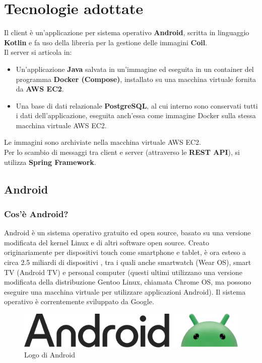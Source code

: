     \section{Tecnologie adottate}
        Il client è un'applicazione per sistema operativo \textbf{Android}, scritta in linguaggio \textbf{Kotlin} e fa uso della libreria per la gestione delle immagini \textbf{Coil}. \\
        Il server si articola in:
        \begin{itemize}
            \item Un'applicazione \textbf{Java} salvata in un'immagine ed eseguita in un container del programma \textbf{Docker (Compose)}, installato su una macchina virtuale fornita da \textbf{AWS EC2}.
            \item Una base di dati relazionale \textbf{PostgreSQL}, al cui interno sono conservati tutti i dati dell'applicazione, eseguita anch'essa come immagine Docker sulla stessa macchina virtuale AWS EC2.
        \end{itemize}
        Le immagini sono archiviate nella macchina virtuale AWS EC2. \\
        Per lo scambio di messaggi tra client e server (attraverso le \textbf{REST API}), si utilizza \textbf{Spring Framework}. \\

        \subsection{Android}
            \subsubsection{Cos'è Android? \cite{Wikipedia1}}
                Android è un sistema operativo gratuito ed open source, basato su una versione modificata del kernel Linux e di altri software open source. Creato originariamente per dispositivi touch come smartphone e tablet, è ora esteso a circa 2.5 miliardi di dispositivi \cite{Google1}, tra i quali anche smartwatch (Wear OS), smart TV (Android TV) e personal computer (questi ultimi utilizzano una versione modificata della distribuzione Gentoo Linux, chiamata Chrome OS, ma possono eseguire una macchina virtuale per utilizzare applicazioni Android). Il sistema operativo è correntemente sviluppato da Google.
            \begin{figure}[htbp!]
                \centering
                \includegraphics[width=0.5\linewidth]{Immagini/System Design/Android.png}
                \caption{Logo di Android}
            \end{figure}
